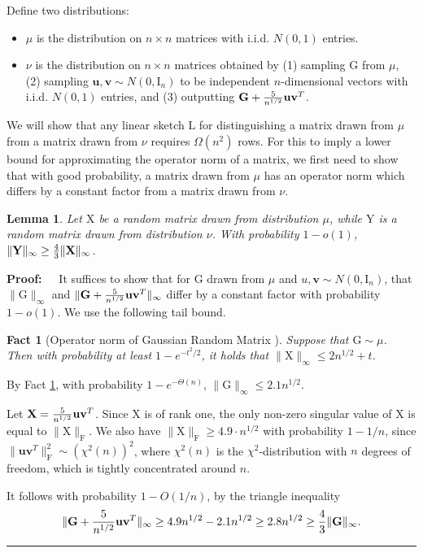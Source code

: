 \documentclass[11pt]{article}
\newcommand{\FNorm }[1]{\mbox{}\|#1\|_\mathrm{F}  }
\newcommand{\FNormS}[1]{\mbox{}\|#1\|_\mathrm{F}^2}
\newtheorem{lemma}[theorem]{Lemma}
\newenvironment{proof}{\begin{trivlist} \item {\bf Proof:~~}}
  {\qed\end{trivlist}}
\newcommand{\mat}[1]{{\ensuremath{\bm{\mathrm{#1}}}}}
\def\u{{\mathbf u}}
\def\ve{{\mathbf v}}
\def\matG{\mat{G}}
\def\matI{\mat{I}}
\def\matL{\mat{L}}
\def\matX{\mat{X}}
\def\matY{\mat{Y}}
\def\frac#1#2{{#1\over #2}}
\def\qed{\hfill\rule{2mm}{2mm}}
\newtheorem{fact}{Fact}
\begin{document}
Define two distributions: 
\begin{itemize}
\item $\mu$ is the distribution on $n \times n$ matrices with i.i.d. $N(0,1)$ entries. 
\item $\nu$ is the distribution on $n \times n$ matrices obtained by 
(1) sampling $\matG$ from $\mu$, (2) sampling $\u, \ve \sim N(0,\matI_n)$ to be independent $n$-dimensional
vectors with i.i.d. $N(0,1)$ entries, and (3) outputting $\matG + \frac{5}{n^{1/2}}\u\ve^T$.
\end{itemize}

We will show that any linear sketch $\matL$ for 
distinguishing a matrix drawn from $\mu$ from a matrix drawn from 
$\nu$ requires $\Omega(n^2)$ rows. For this to imply a lower bound for approximating the operator norm of
a matrix, we first need to show that with good probability, a matrix drawn from $\mu$ has an operator
norm which differs by a constant factor from a matrix drawn from $\nu$. 

\begin{lemma}\label{lem:gap}
Let $\matX$ be a random matrix drawn from distribution $\mu$, while $\matY$ is a random matrix drawn from distribution $\nu$.
With probability $1-o(1)$, $\|\matY\|_{\infty} \geq \frac{4}{3} \|\matX\|_{\infty}$.   
\end{lemma}
\begin{proof}
It suffices to show that for $\matG$ drawn from $\mu$ and $u,\ve \sim N(0,\matI_n)$, that 
$\|\matG\|_{\infty}$ and $\|\matG+\frac{5}{n^{1/2}}\u\ve^T\|_{\infty}$ differ by a constant factor with probability $1-o(1)$. 
We use the following tail bound. 
\begin{fact}[Operator norm of Gaussian Random Matrix  \cite{vershynin2010}]\label{lem:operator norm}
Suppose that $\matG\sim \mu$. Then with probability at least $1 - e^{-t^2/2}$, it holds that $\|\matX\|_{\infty} \leq 2n^{1/2}+t$.
\end{fact}
By Fact \ref{lem:operator norm}, with probability $1-e^{-\Theta(n)}$, $\|\matG\|_{\infty} \leq 2.1n^{1/2}$. 

Let $\matX = \frac{5}{n^{1/2}}\u\ve^T$. 
Since $\matX$ is of rank one, the only non-zero singular value of $\matX$ is equal to $\FNorm{\matX}$. We also have 
$\FNorm{\matX} \geq 4.9\cdot n^{1/2}$ with probability $1-1/n$, 
since $\FNormS{\u\ve^T}\sim (\chi^2(n))^2$, where $\chi^2(n)$ is the $\chi^2$-distribution with $n$ degrees of freedom,
which is tightly concentrated around $n$.

It follows with probability $1-O(1/n)$, by the triangle inequality
$$\|\matG+\frac{5}{n^{1/2}}\u\ve^T\|_{\infty} \geq 4.9n^{1/2} - 2.1n^{1/2} \geq 2.8n^{1/2} \geq \frac{4}{3}\|\matG\|_{\infty}.$$
\end{proof}
\end{document}
